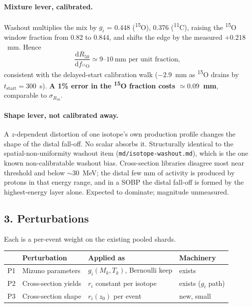 \documentclass[11pt]{article}
\newcommand{\iso}[2]{\textsuperscript{#1}#2}
\newcommand{\Rc}{\ensuremath{R_{50}}}
\begin{document}
\paragraph{Mixture lever, calibrated.} Washout multiplies the mix by
$g_i$ = 0.448 (\iso{15}{O}), 0.376 (\iso{11}{C}), raising the \iso{15}{O} window
fraction from 0.82 to 0.844, and shifts the edge by the measured $+0.218$~mm.
Hence
\begin{equation}
  \frac{\mathrm{d}\Rc}{\mathrm{d}f_{^{15}\mathrm{O}}} \simeq 9\text{--}10~\text{mm per unit fraction},
\end{equation}
consistent with the delayed-start calibration walk ($-2.9$~mm as \iso{15}{O}
drains by $t_{\mathrm{start}} = 300$~s). \textbf{A 1\% error in the \iso{15}{O}
fraction costs $\simeq 0.09$~mm}, comparable to $\sigma_{\Rc}$.

\paragraph{Shape lever, not calibrated away.} A $z$-dependent distortion of one
isotope's own production profile changes the shape of the distal fall-off. No
scalar absorbs it. Structurally identical to the spatial-non-uniformity washout
item (\texttt{md/isotope-washout.md}), which is the one known non-calibratable
washout bias. Cross-section libraries disagree most near threshold and below
$\sim$30~MeV; the distal few mm of activity is produced by protons in that
energy range, and in a SOBP the distal fall-off is formed by the
highest-energy layer alone. Expected to dominate; magnitude unmeasured.

\subsection*{3. Perturbations}

Each is a per-event weight on the existing pooled shards.

\begin{table}[ht]
  \centering
  \begin{tabular}{llll}
    \toprule
    & Perturbation & Applied as & Machinery \\
    \midrule
    P1 & Mizuno parameters & $g_i(M_k,T_k)$, Bernoulli keep & exists \\
    P2 & Cross-section yields & $r_i$ constant per isotope & exists ($g_i$ path) \\
    P3 & Cross-section shape & $r_i(z_0)$ per event & new, small \\
    \bottomrule
  \end{tabular}
\end{table}
\end{document}
